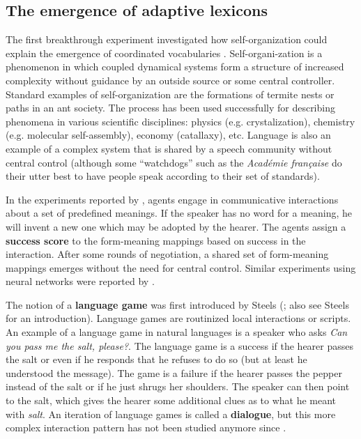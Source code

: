 \largerpage
\subsection{The emergence of adaptive lexicons}
\label{s:history-lex}

The first breakthrough experiment investigated how self-organization could explain the emergence of coordinated vocabularies \citep{steels97selforganizing}. Self-organi-zation is a phenomenon in which coupled dynamical systems form a structure of increased complexity without guidance by an outside source or some central controller. Standard examples of self-organization are the formations of termite nests or paths in an ant society. The process has been used successfully for describing phenomena in various scientific disciplines: physics (e.g. crystalization), chemistry (e.g. molecular self-assembly), economy (catallaxy), etc. Language is also an example of a complex system that is shared by a speech community without central control (although some ``watchdogs'' such as the {\em Acad\'{e}mie fran\c{c}aise} do their utter best to have people speak according to their set of standards). 

In the experiments reported by \citet{steels97selforganizing}, agents engage in communicative interactions about a set of predefined meanings. If the speaker has no word for a meaning, he will invent a new one which may be adopted by the hearer. The agents assign a {\bfseries success score} to the form-meaning mappings based on success in the interaction. After some rounds of negotiation, a shared set of form-meaning mappings emerges without the need for central control. Similar experiments using neural networks were reported by \citet{batali98computational}.

\largerpage
The notion of a {\bfseries language game} was first introduced by Steels (\citeyear{steels96selforganizing}; also see Steels \citeyear{steels01language} for an introduction). Language games are routinized local interactions or scripts. An example of a language game in natural languages is a speaker who asks {\em Can you pass me the salt, please?}. The language game is a success if the hearer passes the salt or even if he responds that he refuses to do so (but at least he understood the message). The game is a failure if the hearer passes the pepper instead of the salt or if he just shrugs her shoulders. The speaker can then point to the salt, which gives the hearer some additional clues as to what he meant with {\em salt}. An iteration of language games is called a {\bfseries dialogue}, but this more complex interaction pattern has not been studied anymore since \citet{steels96selforganizing}. 

